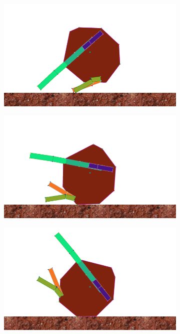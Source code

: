\begin{figure}[H]
        \begin{subfigure}[b]{0.3\textwidth}
          \includegraphics[width=\linewidth,center]{graphics/simulation-discussion/roll_1}
          \caption{\label{fig:roll_1}}
        \end{subfigure}
        \hspace{\fill}
        \begin{subfigure}[b]{0.3\textwidth}
          \includegraphics[width=\linewidth,center]{graphics/simulation-discussion/roll_2}
          \caption{\label{fig:roll_2}}
        \end{subfigure}
        \hspace{\fill}
        \begin{subfigure}[b]{0.3\textwidth}
          \includegraphics[width=\linewidth,center]{graphics/simulation-discussion/roll_3}
          \caption{\label{fig:roll_3}}
        \end{subfigure}


\end{figure}

